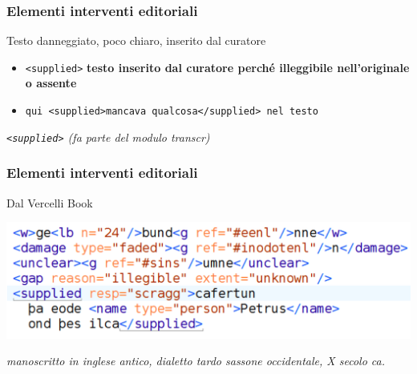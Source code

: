 \begin{frame}
    \frametitle{Elementi interventi editoriali}
    \addtocounter{nframe}{1}
    

    \begin{block}{Testo danneggiato, poco chiaro, inserito dal curatore}
        \begin{itemize}
            \item \texttt{<supplied>} \textbf{testo inserito dal curatore perché illeggibile nell’originale o assente}
            \item[] \texttt{qui <supplied>mancava qualcosa</supplied> nel testo}
        \end{itemize}
        
    \end{block}

    \textit{\texttt{<supplied>}  (fa parte del modulo transcr)}

\end{frame}


\begin{frame}
    \frametitle{Elementi interventi editoriali}
    \addtocounter{nframe}{1}
    

    \begin{block}{Dal Vercelli Book}
         \begin{center}
            \includegraphics[width=.9\textwidth]{imgs/vercelli.png}
        \end{center}
    \end{block}
    \textit{manoscritto in inglese antico, dialetto tardo sassone occidentale, X secolo ca.}

\end{frame}
  


